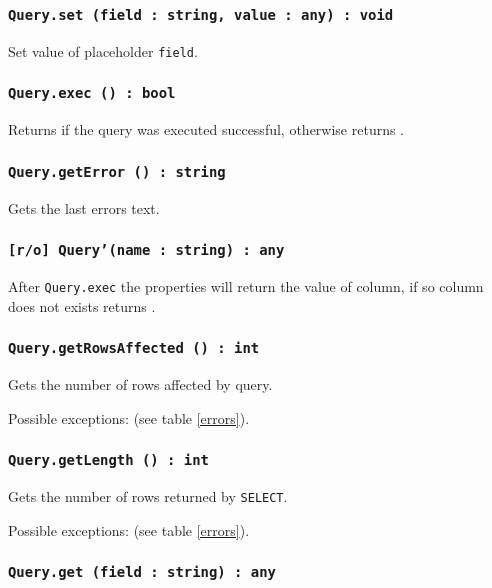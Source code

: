 \subsubsection{\texttt{Query.set (field : string, value : any) : void}}

Set value of placeholder \texttt{field}.

\subsubsection{\texttt{Query.exec () : bool}}

Returns \true{} if the query was executed successful, otherwise returns \false.

\subsubsection{\texttt{Query.getError () : string}}

Gets the last errors text.

\subsubsection{\texttt{[r/o] Query'(name : string) : any}}

After \texttt{Query.exec} the properties will return the value of column, if so column does not exists returns \void.

\subsubsection{\texttt{Query.getRowsAffected () : int}}

Gets the number of rows affected by query.

Possible exceptions:  (see table \ref{errors}).

\subsubsection{\texttt{Query.getLength () : int}}

Gets the number of rows returned by \texttt{SELECT}.

Possible exceptions:  (see table \ref{errors}).

\subsubsection{\texttt{Query.get (field : string) : any}}

